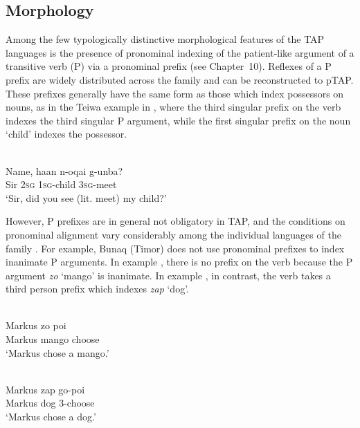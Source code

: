\subsection{Morphology} \label{sec:4:2.2}
Among the few typologically distinctive morphological features of the TAP languages is the presence of pronominal indexing of the patient-like argument of a transitive verb (P) via a pronominal prefix (see Chapter~10). Reflexes of a P prefix are widely distributed across the family and can be reconstructed to pTAP. These prefixes generally have the same form as those which index possessors on nouns, as in the Teiwa example in , where the third singular prefix on the verb indexes the third singular P argument, while the first singular prefix on the noun `child' indexes the possessor.

\ea%
\label{ex:4:1}
 \\
\gll  Name, ha{\textglotstop}an n-oqai g-unba{\textglotstop}? \\
  Sir \textsc{2sg} \textsc{1sg}-child \textsc{3sg}-meet  \\
\glt `Sir, did you see (lit. meet) my child?'
\z




However, P prefixes are in general not obligatory in TAP, and the conditions on pronominal alignment vary considerably among the individual languages of the family \citep[Chapter~10]{FeddenEtAl2013}. For example, Bunaq (Timor) does not use pronominal prefixes to index inanimate P arguments. In example , there is no prefix on the verb because the P argument \textit{zo} `mango' is inanimate. In example , in contrast, the verb takes a third person prefix which indexes \textit{zap} `dog'.

\ea%
\label{ex:4:2}
 \\
\gll  Markus zo poi \\
   Markus mango  choose \\
\glt `Markus chose a mango.'
\z





\ea%
\label{ex:4:3}
 \\
\gll  Markus zap go-poi \\
    Markus dog \textsc{3}-choose\\
\glt `Markus chose a dog.'
\z




